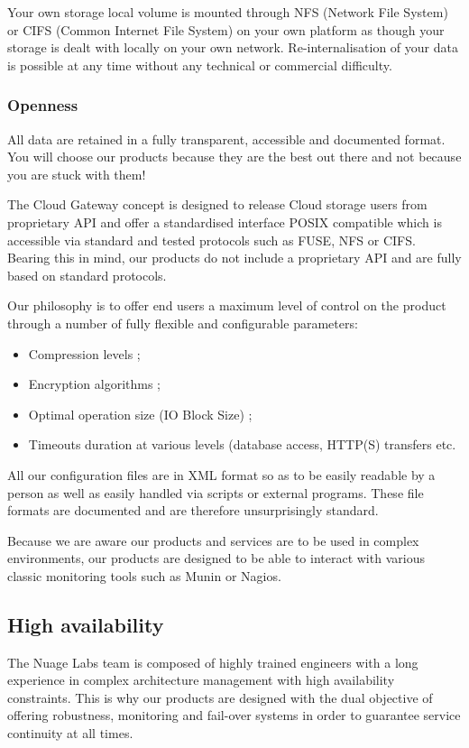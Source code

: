 \documentclass[11pt,fleqn,openany]{book} %
\begin{document}
Your own storage local volume is mounted through NFS (Network File System) or CIFS (Common Internet File System) on your own platform as though your storage is dealt with locally on your own network. Re-internalisation of your data is possible at any time without any technical or commercial difficulty.

\subsubsection*{Openness}

All data are retained in a fully transparent, accessible and documented format. You will choose our products because they are the best out there and not because you are stuck with them!

The Cloud Gateway concept is designed to release Cloud storage users from proprietary API and offer a standardised interface POSIX compatible which is accessible via standard and tested protocols such as FUSE, NFS or CIFS. Bearing this in mind, our products do not include a proprietary API and are fully based on standard protocols.

Our philosophy is to offer end users a maximum level of control on the product through a number of fully flexible and configurable parameters:
\begin{itemize}
\item Compression levels ;
\item Encryption algorithms ;
\item Optimal operation size (IO Block Size) ;
\item Timeouts duration at various levels (database access, HTTP(S) transfers etc.\\
\end{itemize}

All our configuration files are in XML format so as to be easily readable by a person as well as easily handled via scripts or external programs. These file formats are documented and are therefore unsurprisingly standard.

Because we are aware our products and services are to be used in complex environments, our products are designed to be able to interact with various classic monitoring tools such as Munin or Nagios.

\subsection{High availability}

The Nuage Labs team is composed of highly trained engineers with a long experience in complex architecture management with high availability constraints. This is why our products are designed with the dual objective of offering robustness, monitoring and fail-over systems in order to guarantee service continuity at all times.
\end{document}
